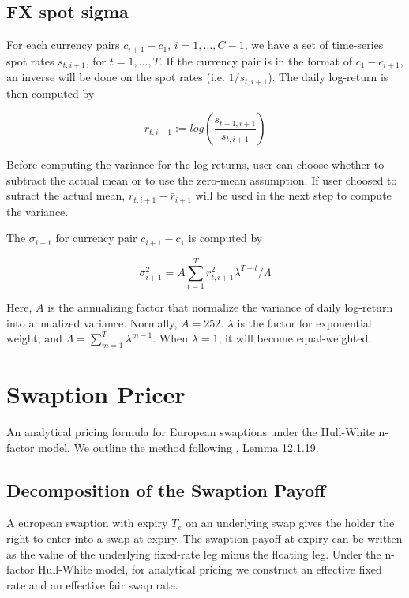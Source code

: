 \documentclass{amsart}
\theoremstyle{plain}
\numberwithin{equation}{section}
\begin{document}
\subsection{FX spot sigma}\label{sec:fx_spot_variance}
For each currency pairs $c_{i+1} - c_1$,  $i = 1,\ldots,C-1$, we have a set of time-series spot rates $s_{t, i+1}$, for $t=1, \ldots,T$. If the currency pair is in the format of $c_1 - c_{i+1}$, an inverse will be done on the spot rates (i.e. $1/s_{t,i+1}$). The daily log-return is then computed by 

\begin{equation}
r_{t,i+1}:=log(\frac{s_{t+1,i+1}}{s_{t,i+1}})
\end{equation}

Before computing the variance for the log-returns, user can choose whether to subtract the actual mean or to use the zero-mean assumption. If user choosed to sutract the actual mean, $r_{t,i+1} - \bar{r}_{i+1}$ will be used in the next step to compute the variance.

The $\sigma_{i+1}$ for currency pair $c_{i+1} - c_1$ is computed by

\begin{equation}
\sigma_{i+1}^2=A\sum_{t=1}^T r_{t,i+1}^2 \lambda^{T-t} / \Lambda
\end{equation}

Here, $A$ is the annualizing factor that normalize the variance of daily log-return into annualized variance. Normally, $A=252$. $\lambda$ is the factor for exponential weight, and $\Lambda=\sum_{m=1}^{T} \lambda^{m-1}$. When $\lambda=1$, it will become equal-weighted.

\section{Swaption Pricer}

An analytical pricing formula for European swaptions under the Hull-White n-factor model. We outline the method following \cite{Andersen_Piterbarg_2010}, Lemma 12.1.19.

\subsection{Decomposition of the Swaption Payoff}

A european swaption with expiry $T_e$ on an underlying swap gives the holder the right to enter into a swap at
expiry. The swaption payoff at expiry can be written as the value of the underlying fixed-rate leg minus the floating
leg. Under the n-factor Hull-White model, for analytical pricing we construct an effective fixed rate and an effective
fair swap rate.
\end{document}
